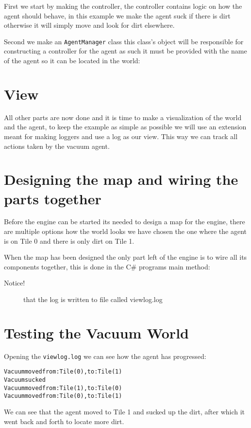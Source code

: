 First we start by making the controller, the controller contains logic
on how the agent should behave, in this example we make the agent
suck if there is dirt otherwise it will simply move and look for dirt
elsewhere.



Second we make an \texttt{AgentManager} class this class\textquoteright{}s
object will be responsible for constructing a controller for the agent
as such it must be provided with the name of the agent so it can be
located in the world:




\section{View}

All other parts are now done and it is time to make a visualization
of the world and the agent, to keep the example as simple as possible
we will use an extension meant for making loggers and use a log as
our view. This way we can track all actions taken by the vacuum agent.




\section{Designing the map and wiring the parts together}

Before the engine can be started its needed to design a map for the
engine, there are multiple options how the world looks we have chosen
the one where the agent is on Tile 0 and there is only dirt on Tile
1.



When the map has been designed the only part left of the engine is
to wire all its components together, this is done in the C\# programs
main method:
\begin{description}
\item [{Notice!}] that the log is written to file called viewlog.log
\end{description}



\section{Testing the Vacuum World}

Opening the \texttt{viewlog.log} we can see how the agent has progressed:

\begin{alltt}
Vacuum moved from: Tile(0), to: Tile(1) 
Vacuum sucked 
Vacuum moved from: Tile(1), to: Tile(0) 
Vacuum moved from: Tile(0), to: Tile(1)
\end{alltt}

We can see that the agent moved to Tile 1 and sucked up the dirt,
after which it went back and forth to locate more dirt.
